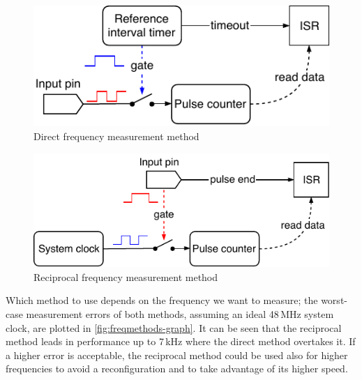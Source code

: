 \begin{figure}[h]
	\centering
	\includegraphics[scale=1] {img/fcap-direct.pdf}
	\caption{\label{fig:fcap-direct-dia}Direct frequency measurement method}
\end{figure}

\begin{figure}[h]
\centering
\includegraphics[scale=1] {img/fcap-reciprocal.pdf}
\caption{\label{fig:fcap-reci-dia}Reciprocal frequency measurement method}
\end{figure}

Which method to use depends on the frequency we want to measure; the worst-case measurement errors of both methods, assuming an ideal 48\,MHz system clock, are plotted in \cref{fig:freqmethods-graph}. It can be seen that the reciprocal method leads in performance up to 7\,kHz where the direct method overtakes it. If a higher error is acceptable, the reciprocal method could be used also for higher frequencies to avoid a reconfiguration and to take advantage of its higher speed.

